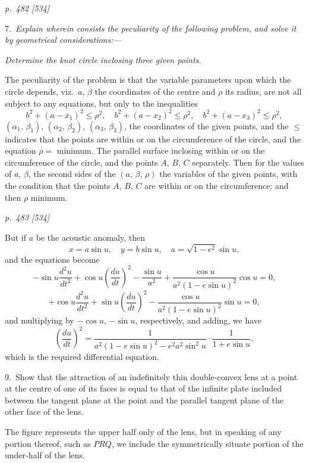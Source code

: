 \documentclass[11pt,a4paper]{book}
\begin{document}
\clearpage

\bigskip
\textit{p.~482 [534]}
\smallskip

\noindent\textsc{7.}\, \textit{Explain wherein consists the peculiarity of the following problem, and solve it
by geometrical considerations:---}

\textit{Determine the knot circle inclosing three given points.}

The peculiarity of the problem is that the variable parameters upon which the
circle depends, viz.\ $a$, $\beta$ the coordinates of the centre and $\rho$ its radius, are not all
subject to any equations, but only to the inequalities
\[
b^2 + (a - x_1)^2 \leq \rho^2, \quad b^2 + (a - x_2)^2 \leq \rho^2,\quad b^2 + (a - x_3)^2 \leq \rho^2,
\]
$(\alpha_1,\,\beta_1)$, $(\alpha_2,\,\beta_2)$, $(\alpha_3,\,\beta_3)$, the coordinates of the given points, and the $\leq$ indicates that the
points are within or on the circumference of the circle, and the equation $\rho = $ minimum.
The parallel surface inclosing within or on the circumference of the circle, and the
points $A$, $B$, $C$ separately. Then for the values of $a$, $\beta$, the second sides of the
$(a,\,\beta,\,\rho)$ the variables of the given points, with the condition that the points $A$, $B$, $C$ are within or on the circumference; and then $\rho$ minimum.

\clearpage

\bigskip
\textit{p.~483 [534]}
\smallskip

But if $a$ be the acoustic anomaly, then
\[
x = a\sin u, \quad y = b\sin u, \quad a = \sqrt{1 - e^2}\sin u,
\]
and the equations become
\[
-\sin u\frac{d^2u}{dt^2}+\cos u\left(\frac{du}{dt}\right)^2-\frac{\sin u}{a^2} + \frac{\cos u}{a^2(1 - e\sin u)^2}\cos u = 0,
\]
\[
+\cos u\frac{d^2u}{dt^2}+\sin u\left(\frac{du}{dt}\right)^2-\frac{\cos u}{a^2(1 - e\sin u)^2}\sin u = 0,
\]
and multiplying by $-\cos u$, $-\sin u$, respectively, and adding, we have
\[
\left(\frac{du}{dt}\right)^2 = \frac{1}{a^2(1 - e\sin u)^2 - e^2 a^2\sin^2 u}\cdot\frac{1}{1+e\sin u},
\]
which is the required differential equation.

\smallskip
\noindent\textsc{9.}\, Show that the attraction of an indefinitely thin double-convex lens at a point at
the centre of one of its faces is equal to that of the infinite plate included between the
tangent plane at the point and the parallel tangent plane of the other face of the lens.

The figure represents the upper half only of the lens, but in speaking of any
portion thereof, such as $PRQ$, we include the symmetrically situate portion of the
under-half of the lens.
\end{document}
